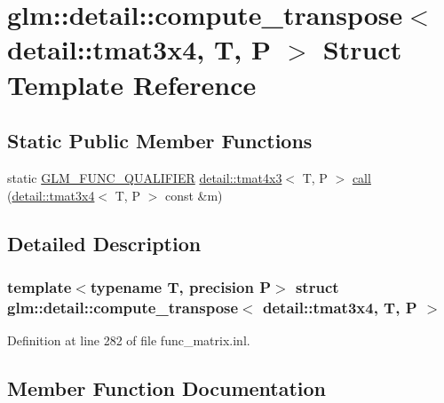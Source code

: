 \hypertarget{structglm_1_1detail_1_1compute__transpose_3_01detail_1_1tmat3x4_00_01_t_00_01_p_01_4}{}\section{glm\+:\+:detail\+:\+:compute\+\_\+transpose$<$ detail\+:\+:tmat3x4, T, P $>$ Struct Template Reference}
\label{structglm_1_1detail_1_1compute__transpose_3_01detail_1_1tmat3x4_00_01_t_00_01_p_01_4}
\subsection*{Static Public Member Functions}
\begin{DoxyCompactItemize}
\item 
static \hyperlink{setup_8hpp_a33fdea6f91c5f834105f7415e2a64407}{G\+L\+M\+\_\+\+F\+U\+N\+C\+\_\+\+Q\+U\+A\+L\+I\+F\+I\+ER} \hyperlink{structglm_1_1detail_1_1tmat4x3}{detail\+::tmat4x3}$<$ T, P $>$ \hyperlink{structglm_1_1detail_1_1compute__transpose_3_01detail_1_1tmat3x4_00_01_t_00_01_p_01_4_a1cd1f07ec6c02b790e15ae86c40fb5b0}{call} (\hyperlink{structglm_1_1detail_1_1tmat3x4}{detail\+::tmat3x4}$<$ T, P $>$ const \&m)
\end{DoxyCompactItemize}


\subsection{Detailed Description}
\subsubsection*{template$<$typename T, precision P$>$\newline
struct glm\+::detail\+::compute\+\_\+transpose$<$ detail\+::tmat3x4, T, P $>$}



Definition at line 282 of file func\+\_\+matrix.\+inl.



\subsection{Member Function Documentation}
\mbox{\label{structglm_1_1detail_1_1compute__transpose_3_01detail_1_1tmat3x4_00_01_t_00_01_p_01_4_a1cd1f07ec6c02b790e15ae86c40fb5b0}} 
